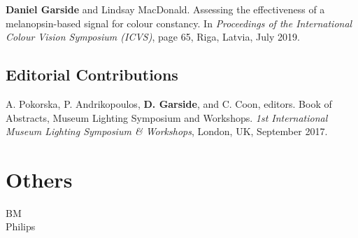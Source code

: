 {\textbf{Daniel Garside} and Lindsay MacDonald. Assessing the effectiveness of a melanopsin-based signal for colour constancy. In \textit{Proceedings of the International Colour Vision Symposium (ICVS)}, page 65, Riga, Latvia, July 2019. 
\bigskip

\subsection*{Editorial Contributions}
A. Pokorska, P. Andrikopoulos, \textbf{D. Garside}, and C. Coon, editors. Book of Abstracts, Museum Lighting Symposium and Workshops.  \textit{1st International Museum Lighting Symposium \& Workshops}, London, UK, September 2017. 

}

\section{Others}
BM\\
Philips \\